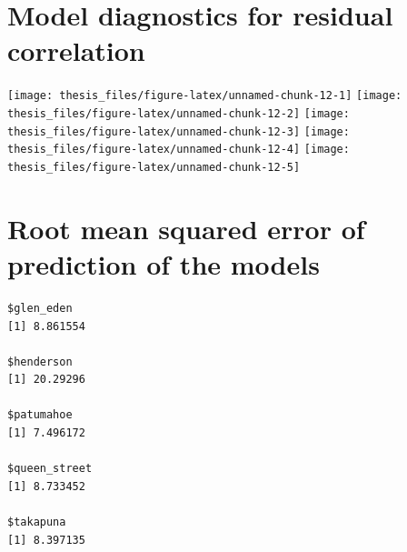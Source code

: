 \documentclass{aucklandthesis}
\begin{document}
\hypertarget{model-diagnostics-for-residual-correlation}{%
\section{Model diagnostics for residual correlation}\label{model-diagnostics-for-residual-correlation}}

\texttt{[image: thesis\_files/figure-latex/unnamed-chunk-12-1]}
\texttt{[image: thesis\_files/figure-latex/unnamed-chunk-12-2]}
\texttt{[image: thesis\_files/figure-latex/unnamed-chunk-12-3]}
\texttt{[image: thesis\_files/figure-latex/unnamed-chunk-12-4]}
\texttt{[image: thesis\_files/figure-latex/unnamed-chunk-12-5]}
\newpage

\hypertarget{root-mean-squared-error-of-prediction-of-the-models}{%
\section{Root mean squared error of prediction of the models}\label{root-mean-squared-error-of-prediction-of-the-models}}

\begin{verbatim}
$glen_eden
[1] 8.861554

$henderson
[1] 20.29296

$patumahoe
[1] 7.496172

$queen_street
[1] 8.733452

$takapuna
[1] 8.397135
\end{verbatim}

\printbibliography[heading=bibintoc]
\end{document}
